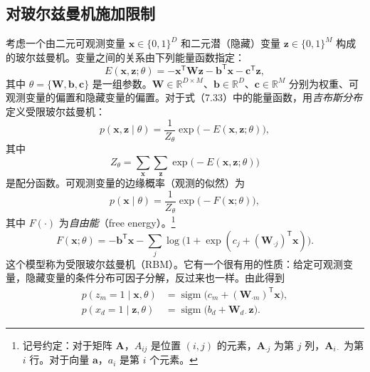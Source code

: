 \subsection{对玻尔兹曼机施加限制}
考虑一个由二元可观测变量 $\mathbf{x}\in\{0,1\}^{D}$ 和二元潜（隐藏）变量 $\mathbf{z}\in\{0,1\}^{M}$ 构成的玻尔兹曼机。变量之间的关系由下列能量函数指定：
\begin{equation}
E(\mathbf{x},\mathbf{z};\theta)
 =-\mathbf{x}^{\mathsf T}\mathbf{W}\mathbf{z}
  -\mathbf{b}^{\mathsf T}\mathbf{x}-\mathbf{c}^{\mathsf T}\mathbf{z},
\tag{7.33}\label{eq:07-33}
\end{equation}
其中 $\theta=\{\mathbf{W},\mathbf{b},\mathbf{c}\}$ 是一组参数。$\mathbf{W}\in\mathbb{R}^{D\times M}$、$\mathbf{b}\in\mathbb{R}^{D}$、$\mathbf{c}\in\mathbb{R}^{M}$ 分别为权重、可观测变量的偏置和隐藏变量的偏置。对于式（7.33）中的能量函数，用\emph{吉布斯分布}定义受限玻尔兹曼机：
\begin{equation}
p(\mathbf{x},\mathbf{z}\mid\theta)
 =\frac{1}{Z_\theta}\exp\bigl(-E(\mathbf{x},\mathbf{z};\theta)\bigr),
\tag{7.34}\label{eq:07-34}
\end{equation}
其中
\begin{equation}
Z_\theta=\sum_{\mathbf{x}}\sum_{\mathbf{z}}
               \exp\bigl(-E(\mathbf{x},\mathbf{z};\theta)\bigr)
\tag{7.35}\label{eq:07-35}
\end{equation}
是配分函数。可观测变量的边缘概率（观测的似然）为
\begin{equation}
p(\mathbf{x}\mid\theta)=\frac1{Z_\theta}\exp\bigl(-F(\mathbf{x};\theta)\bigr),
\tag{7.36}\label{eq:07-36}
\end{equation}
其中 $F(\cdot)$ 为\emph{自由能}（free energy）。\footnote{记号约定：对于矩阵 $\mathbf{A}$，$A_{ij}$ 是位置 $(i,j)$ 的元素，$\mathbf{A}_{\cdot j}$ 为第 $j$ 列，$\mathbf{A}_{i\cdot}$ 为第 $i$ 行。对于向量 $\mathbf{a}$，$a_i$ 是第 $i$ 个元素。}
\begin{equation}
F(\mathbf{x};\theta)=-\mathbf{b}^{\mathsf T}\mathbf{x}
 -\sum_j\log\bigl(1+\exp(c_j+(\mathbf{W}_{\cdot j})^{\mathsf T}\mathbf{x})\bigr).
\tag{7.37}\label{eq:07-37}
\end{equation}
这个模型称为受限玻尔兹曼机（RBM）。它有一个很有用的性质：给定可观测变量，隐藏变量的条件分布可因子分解，反过来也一样。由此得到
\begin{align}
p(z_m=1\mid\mathbf{x},\theta)&=\operatorname{sigm}\bigl(c_m+(\mathbf{W}_{\cdot m})^{\mathsf T}\mathbf{x}\bigr),
              \tag{7.38}\label{eq:07-38}\\
p(x_d=1\mid\mathbf{z},\theta)&=\operatorname{sigm}\bigl(b_d+\mathbf{W}_{d\cdot}\mathbf{z}\bigr).
              \tag{7.39}\label{eq:07-39}
\end{align}

